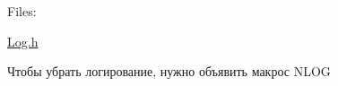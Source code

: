 Files:
\begin{DoxyItemize}
\item \hyperlink{_l_o_g_8h}{Log.h}
\end{DoxyItemize}

Чтобы убрать логирование, нужно объявить макрос NLOG 